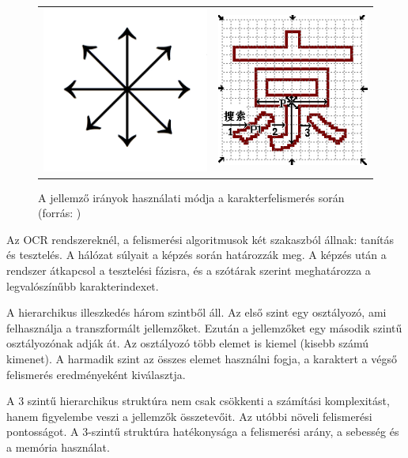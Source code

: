 \begin{figure}[h]
\centering
\begin{tabular}{ c c }
\includegraphics[scale=0.6]{images/8direction} & \includegraphics[scale=0.6]{images/ocr_PDC}
\end{tabular}
\caption{A jellemző irányok használati módja a karakterfelismerés során (forrás: \cite{wu2002recognition})}
\label{fig:8direction}
\end{figure}

Az OCR rendszereknél, a felismerési algoritmusok két szakaszból állnak: tanítás és tesztelés. A hálózat súlyait a képzés során határozzák meg. A képzés után a rendszer átkapcsol a tesztelési fázisra, és a szótárak szerint meghatározza a legvalószínűbb karakterindexet.

A hierarchikus illeszkedés három szintből áll. Az első szint egy osztályozó, ami felhasználja a transzformált jellemzőket. Ezután a jellemzőket egy második szintű osztályozónak adják át. Az osztályozó több elemet is kiemel (kisebb számú kimenet). A harmadik szint az összes elemet használni fogja, a karaktert a végső felismerés eredményeként kiválasztja.

A 3 szintű hierarchikus struktúra nem csak csökkenti a számítási komplexitást, hanem figyelembe veszi a jellemzők összetevőit. Az utóbbi növeli felismerési pontosságot. A 3-szintű struktúra hatékonysága a felismerési arány, a sebesség és a memória használat.

